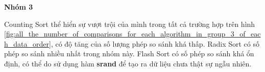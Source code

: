 \textbf{Nhóm 3}

Counting Sort thể hiển sự vượt trội của mình trong tất cả trường hợp trên hình \ref{fig:all_the_number_of_comparisons_for_each_algorithm_in_group_3_of_each_data_order}, có độ tăng của số lượng phép so sánh khá thấp. Radix Sort có số phép so sánh nhiều nhất trong nhóm này. Flash Sort có số phép so sánh khá ổn định, có thể do sử dụng hàm \textbf{srand} để tạo ra dữ liệu chưa thật sự ngẫu nhiên.
